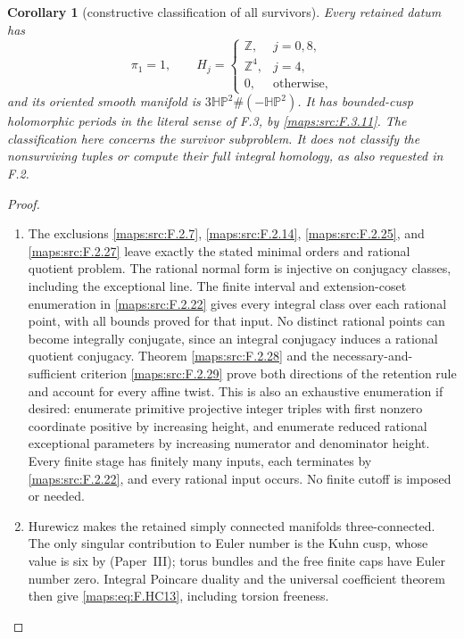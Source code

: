 \documentclass[11pt,a4paper]{article}
\newtheorem{corollary}[corollary]{Corollary}
\theoremstyle{definition}
\newcommand{\ExternalPaperRef}[3]{\ifmmode\text{\upshape #1#2 (Paper~#3)}\else #1#2 (Paper~#3)\fi}
\begin{document}
\begin{corollary}[constructive classification of all survivors]
Every retained datum has
\[
 \pi_1=1,\qquad
 H_j=\begin{cases}
  \mathbb Z,&j=0,8,\\
  \mathbb Z^4,&j=4,\\
  0,&\text{otherwise},
 \end{cases}
 \tag{F.HC13}\label{maps:eq:F.HC13}
\]
and its oriented smooth manifold is
$3\mathbb{HP}^2\#(-\mathbb{HP}^2)$.
It has bounded-cusp holomorphic periods in the literal
sense of F.3, by \ref{maps:src:F.3.11}.
The classification here concerns the survivor subproblem.
It does not classify the nonsurviving tuples or compute
their full integral homology, as also requested in F.2.

\end{corollary}


\begin{proof}
\begin{enumerate}[label=\arabic*.]
\item The exclusions \ref{maps:src:F.2.7}, \ref{maps:src:F.2.14}, \ref{maps:src:F.2.25}, and \ref{maps:src:F.2.27}
leave exactly the stated minimal orders and rational
quotient problem.
The rational normal form is injective on conjugacy
classes, including the exceptional line.
The finite interval and extension-coset enumeration
in \ref{maps:src:F.2.22} gives every integral class over each rational
point, with all bounds proved for that input.
No distinct rational points can become integrally
conjugate, since an integral conjugacy induces a
rational quotient conjugacy.
Theorem \ref{maps:src:F.2.28} and the necessary-and-sufficient
criterion \ref{maps:src:F.2.29} prove both directions of the
retention rule and account for every affine twist.
This is also an exhaustive enumeration if desired:
enumerate primitive projective integer triples with
first nonzero coordinate positive by increasing height,
and enumerate reduced rational exceptional parameters
by increasing numerator and denominator height.
Every finite stage has finitely many inputs, each
terminates by \ref{maps:src:F.2.22}, and every rational input occurs.
No finite cutoff is imposed or needed.

\item Hurewicz makes the retained simply connected manifolds
three-connected.  The only singular contribution to
Euler number is the Kuhn cusp, whose value is six
by \ExternalPaperRef{}{6.3}{III}; torus bundles and the free finite caps have
Euler number zero.
Integral Poincare duality and the universal coefficient
theorem then give \eqref{maps:eq:F.HC13}, including torsion freeness.


\end{enumerate}
\end{proof}
\end{document}
